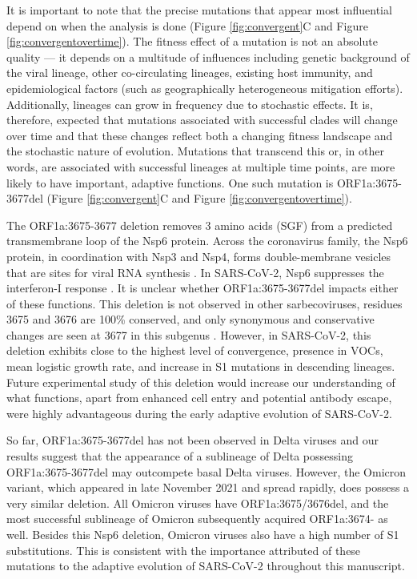 \documentclass[11pt,oneside,letterpaper]{article}
\begin{document}
It is important to note that the precise mutations that appear most influential depend on when the analysis is done (Figure \ref{fig:convergent}C and Figure \ref{fig:convergentovertime}).
The fitness effect of a mutation is not an absolute quality --- it depends on a multitude of influences including genetic background of the viral lineage, other co-circulating lineages, existing host immunity, and epidemiological factors (such as geographically heterogeneous mitigation efforts).
Additionally, lineages can grow in frequency due to stochastic effects. 
It is, therefore, expected that mutations associated with successful clades will change over time and that these changes reflect both a changing fitness landscape and the stochastic nature of evolution.
Mutations that transcend this or, in other words, are associated with successful lineages at multiple time points, are more likely to have important, adaptive functions.
One such mutation is ORF1a:3675-3677del (Figure \ref{fig:convergent}C and Figure \ref{fig:convergentovertime}).

The ORF1a:3675-3677 deletion removes 3 amino acids (SGF) from a predicted transmembrane loop \cite{Benvenuto2020-uc} of the Nsp6 protein.
Across the coronavirus family, the Nsp6 protein, in coordination with Nsp3 and Nsp4, forms double-membrane vesicles that are sites for viral RNA synthesis \cite{Snijder2020-vx}.
In SARS-CoV-2, Nsp6 suppresses the interferon-I response \cite{Xia2020-zs}. It is unclear whether ORF1a:3675-3677del impacts either of these functions.
This deletion is not observed in other sarbecoviruses, residues 3675 and 3676 are 100\% conserved, and only synonymous and conservative changes are seen at 3677 in this subgenus \cite{Jungreis2021-vv}.
However, in SARS-CoV-2, this deletion exhibits close to the highest level of convergence, presence in VOCs, mean logistic growth rate, and increase in S1 mutations in descending lineages.
Future experimental study of this deletion would increase our understanding of what functions, apart from enhanced cell entry and potential antibody escape, were highly advantageous during the early adaptive evolution of SARS-CoV-2.

So far, ORF1a:3675-3677del has not been observed in Delta viruses and our results suggest that the appearance of a sublineage of Delta possessing ORF1a:3675-3677del may outcompete basal Delta viruses.
However, the Omicron variant, which appeared in late November 2021 and spread rapidly, does possess a very similar deletion. 
All Omicron viruses have ORF1a:3675/3676del, and the most successful sublineage of Omicron subsequently acquired ORF1a:3674- as well.
Besides this Nsp6 deletion, Omicron viruses also have a high number of S1 substitutions. 
This is consistent with the importance attributed of these mutations to the adaptive evolution of SARS-CoV-2 throughout this manuscript.
\end{document}
